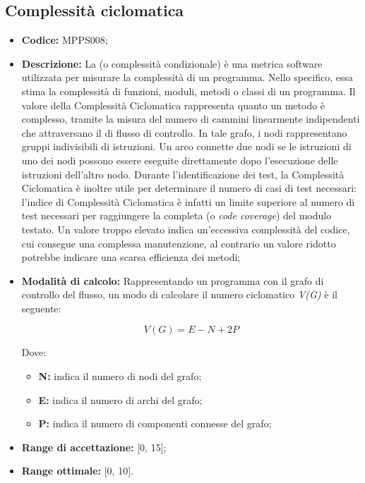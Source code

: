 \documentclass[openany,12pt,a4paper]{report}
\begin{document}
\subsection{Complessità ciclomatica}

\begin{itemize}
    \item \textbf{Codice:} MPPS008;

    \item \textbf{Descrizione:} La  (o complessità condizionale) è una metrica software utilizzata per misurare la complessità di un programma. Nello specifico, essa stima la complessità di funzioni, moduli, metodi o classi di un programma. Il valore della Complessità Ciclomatica rappresenta quanto un metodo è complesso, tramite la misura del numero di cammini linearmente indipendenti che attraversano il  di flusso di controllo. In tale grafo, i nodi rappresentano gruppi indivisibili di istruzioni. Un arco connette due nodi se le istruzioni di uno dei nodi possono essere eseguite direttamente dopo l'esecuzione delle istruzioni dell'altro nodo. Durante l’identificazione dei test, la Complessità Ciclomatica è inoltre utile per determinare il numero di casi di test necessari: l’indice di Complessità Ciclomatica è infatti un limite superiore al numero di test necessari per raggiungere la completa  (o \textit{code coverage}) del modulo testato. Un valore troppo elevato indica un'eccessiva complessità del codice, cui consegue una complessa manutenzione, al contrario un valore ridotto potrebbe indicare una scarsa efficienza dei metodi;

    \item \textbf{Modalità di calcolo:} Rappresentando un programma con il grafo di controllo del flusso, un modo di calcolare il numero ciclomatico \textit{V(G)} è il seguente:
    
    \[ V(G) = E - N + 2P \]
    
    Dove:
    
    \begin{itemize}
        \item \textbf{N:} indica il numero di nodi del grafo;
        \item \textbf{E:} indica il numero di archi del grafo;
        \item \textbf{P:} indica il numero di componenti connesse del grafo;
    \end{itemize}
    
    \item \textbf{Range di accettazione:} [0, 15];
    \item \textbf{Range ottimale:} [0, 10].
\end{itemize}
\end{document}
